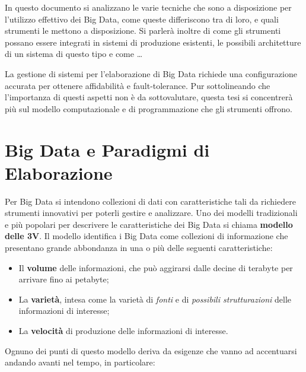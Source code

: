 \documentclass[italian,a4paper, twoside, 12pt]{report}
\providecommand{\tightlist}{%
  \setlength{\itemsep}{0pt}\setlength{\parskip}{0pt}}
\begin{document}
In questo documento si analizzano le varie tecniche che sono a
disposizione per l'utilizzo effettivo dei Big Data, come queste
differiscono tra di loro, e quali strumenti le mettono a disposizione.
Si parlerà inoltre di come gli strumenti possano essere integrati in
sistemi di produzione esistenti, le possibili architetture di un sistema
di questo tipo e come \ldots{}

La gestione di sistemi per l'elaborazione di Big Data richiede una
configurazione accurata per ottenere affidabilità e fault-tolerance. Pur
sottolineando che l'importanza di questi aspetti non è da sottovalutare,
questa tesi si concentrerà più sul modello computazionale e di
programmazione che gli strumenti offrono.

\chapter{Big Data e Paradigmi di
Elaborazione}\label{big-data-e-paradigmi-di-elaborazione}

Per Big Data si intendono collezioni di dati con caratteristiche tali da
richiedere strumenti innovativi per poterli gestire e analizzare. Uno
dei modelli tradizionali e più popolari per descrivere le
caratteristiche dei Big Data si chiama \textbf{modello delle 3V}. Il
modello identifica i Big Data come collezioni di informazione che
presentano grande abbondanza in una o più delle seguenti
caratteristiche:

\begin{itemize}
\tightlist
\item
  Il \textbf{volume} delle informazioni, che può aggirarsi dalle decine
  di terabyte per arrivare fino ai petabyte;
\item
  La \textbf{varietà}, intesa come la varietà di \emph{fonti} e di
  \emph{possibili strutturazioni} delle informazioni di interesse;
\item
  La \textbf{velocità} di produzione delle informazioni di interesse.
\end{itemize}

Ognuno dei punti di questo modello deriva da esigenze che vanno ad
accentuarsi andando avanti nel tempo, in particolare:
\end{document}
